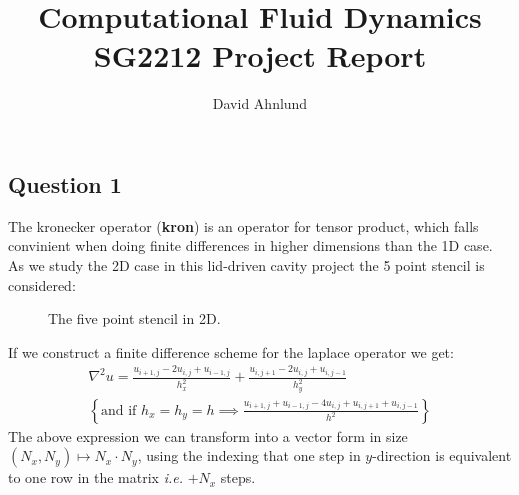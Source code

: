 \documentclass[10pt]{report}
\title{\huge{Computational Fluid Dynamics}\\\Large{SG2212 Project Report}}
\author{\LARGE{David Ahnlund}}
\date{}
\newcommand{\stencilpt}[4][]{\node[circle,fill=blue,draw=blue, label={[shift={(-0.4,-0.0)}]below:#4},#1] at (#2) (#3) {}}
\begin{document}
\maketitle
\newpage%
\pagestyle{fancy}

\subsection*{Question 1}
The kronecker operator (\textbf{kron}) is an operator for tensor product, which falls convinient
when doing finite differences in higher dimensions than the 1D case. As we study the 2D case in this
lid-driven cavity project the 5 point stencil is considered:


\begin{figure}[h]
    \centering
    
    \caption{The five point stencil in 2D.} 
    \label{fivepoint}  
\end{figure}
If we construct a finite difference scheme for the laplace operator we get:
\begin{gather}
    \nabla^2u = \frac{u_{i+1,j}-2u_{i,j}+u_{i-1,j}}{h_x^2} + \frac{u_{i,j+1}-2u_{i,j}+u_{i,j-1}}{h_y^2}\\
    \left\{  \text{and if }h_x = h_y = h \implies \frac{u_{i+1,j}+u_{i-1,j} -4u_{i,j}+ u_{i,j+1}+u_{i,j-1}}{h^2} \right\}\label{simpllap}
\end{gather}
The above expression we can transform into a vector form in size $(N_x, N_y) \mapsto N_x \cdot N_y$, using the indexing
that one step in $y$-direction is equivalent to one row in the matrix \textit{i.e.} $+N_x$ steps.
\end{document}

